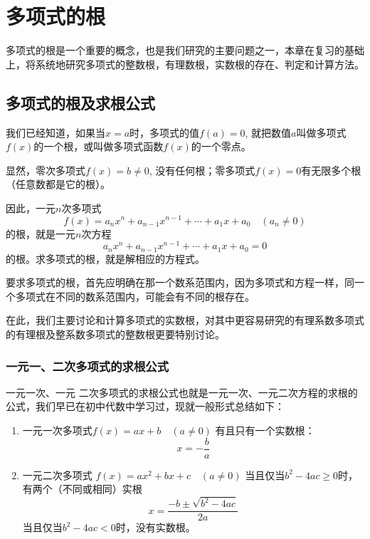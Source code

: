 \chapter{多项式的根}
多项式的根是一个重要的概念，也是我们研究的主要问题之一，本章在复习的基础上，将系统地研究多项式的整数根，有理数根，实数根的存在、判定和计算方法。

\section{多项式的根及求根公式}
我们已经知道，如果当$x=a$时，多项式的值$f(a)=0$, 就把数值$a$叫做多项式$f(x)$的一个根，或叫做多项式函数$f(x)$的一个零点。

显然，零次多项式$f(x)=b\ne 0$, 没有任何根；零多项式$f(x)=0$有无限多个根（任意数都是它的根）。

因此，一元$n$次多项式
\[f(x)=a_nx^n+a_{n-1}x^{n-1}+\cdots+a_1x+a_0\quad (a_n\ne 0)\]
的根，就是一元$n$次方程
\[a_nx^n+a_{n-1}x^{n-1}+\cdots+a_1x+a_0=0\]
的根。求多项式的根，就是解相应的方程式。

要求多项式的根，首先应明确在那一个数系范围内，因为多项式和方程一样，同一个多项式在不同的数系范围内，可能会有不同的根存在。

在此，我们主要讨论和计算多项式的实数根，对其中更容易研究的有理系数多项式的有理根及整系数多项式的整数根更要特别讨论。

\subsection{一元一、二次多项式的求根公式}

一元一次、一元
二次多项式的求根公式也就是一元一次、一元二次方程的求根的公式，我们早已在初中代数中学习过，现就一般形式总结如下：

\begin{enumerate}
    \item 一元一次多项式$  f (x) =ax+b\quad  (a\ne 0)$
    有且只有一个实数根：
    \begin{equation}
        x=-\frac{b}{a}
    \end{equation}
    \item 一元二次多项式
    $f (x) =ax^2+bx+c\quad  (a\ne0)$
    当且仅当$b^2-4ac\ge 0$时，有两个（不同或相同）实根
    \begin{equation}
        x=\frac{-b\pm\sqrt{b^2-4ac}}{2a}
    \end{equation}
    当且仅当$b^2-4ac<0$时，没有实数根。
\end{enumerate}


